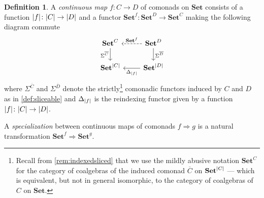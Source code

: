 \documentclass[11pt, oneside, article]{memoir}
\theoremstyle{plain}
\theoremstyle{definition}
\newtheorem{definition}[def]{Definition}
\theoremstyle{remark}
\DeclarePairedDelimiter{\abs}{\lvert}{\rvert}
\newcommand{\namedcat}[1]{\mathbf{#1}}
\newcommand{\Set}{\namedcat{Set}}
\newcommand{\CoalgOn}[2]{{#2}^{#1}}
\newcommand{\CoalgSet}[1]{\CoalgOn{#1}{\Set}}
\newcommand{\clift}[1]{\overline{#1}}
\newcommand{\pts}[1]{{\abs{#1}}}
\newcommand{\one}[1]{\pts{#1}}
\newcommand{\carr}{\Sigma}
\newcommand{\reindex}[1]{\Delta_{#1}}
\newcommand{\car}[1]{\carr^{#1}}
\newcommand{\con}[2]{{#1}^{#2}}
\newcommand{\cmnd}[1]{{#1}}
\newcommand{\cC}{\cmnd{C}}
\newcommand{\cD}{\cmnd{D}}
\newcommand{\CSet}{\CoalgSet{\cC}}
\newcommand{\DSet}{\CoalgSet{\cD}}
\newcommand{\SetpC}{\Set^\pts{\cC}}
\newcommand{\SetpD}{\Set^\pts{\cD}}
\begin{document}
\begin{definition}\label{def:continuousset}\label{def:specializationset}
  A \emph{continuous map} $f \colon \cC \to \cD$ of comonads on $\Set$
  consists of a function $\one{f} \colon \pts{\cC} \to \pts{\cD}$ and
  a functor $\con{\Set}{f} \colon \DSet \to \CSet$ making the following
  diagram commute
  \[
    \begin{tikzcd}
      \CSet & \DSet \\
      {\SetpC} & {\SetpD}
      \arrow["\car{\clift{\cC}}"', from=1-1, to=2-1]
      \arrow["{\con{\Set}{f}}"', dashed, from=1-2, to=1-1]
      \arrow["\car{\clift{\cD}}", from=1-2, to=2-2]
      \arrow["{\reindex{\one{f}}}", from=2-2, to=2-1]
    \end{tikzcd}
  \]
  where $\car{\clift{\cC}}$ and $\car{\clift{\cD}}$ denote the
  strictly\footnote{Recall from \cref{rem:indexedsliced} that we use
    the mildly abusive notation $\CSet$ for the category of coalgebras
    of the induced comonad $\clift{\cC}$ on $\SetpC$ --- which is
    equivalent, but not in general isomorphic, to the category
    of coalgebras of $\cC$ on $\Set$.} comonadic functors induced by $\cC$ and
  $\cD$ as in \cref{def:sliceable} and $\reindex{\one{f}}$ is the
  reindexing functor given by a function
  $\one{f} \colon \pts{\cC} \to \pts{\cD}$.

  A \emph{specialization} between continuous maps of comonads
  $f \Rightarrow g$ is a natural transformation
  $\con{\Set}{f} \Rightarrow \con{\Set}{g}$.
\end{definition}
\end{document}
